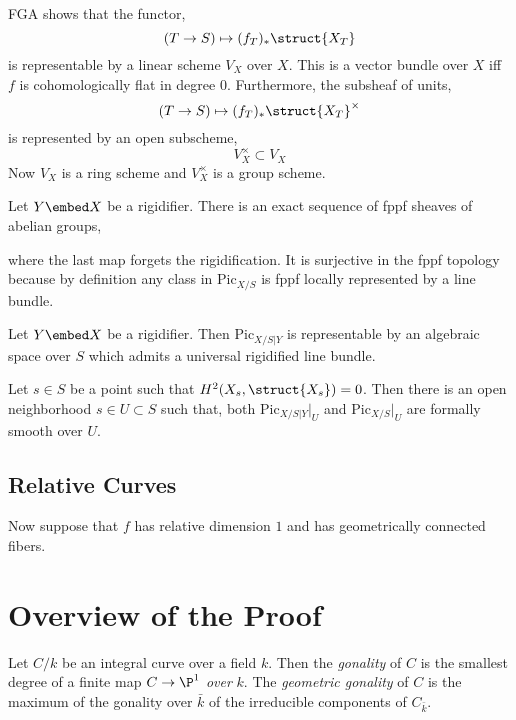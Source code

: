 \documentclass[12pt]{article}
\newcommand{\fPic}{\mathrm{Pic}}
\begin{document}
FGA shows that the functor,
\[ (T \to S) \mapsto (f_T)_* \struct{X_T} \]
is representable by a linear scheme $V_X$ over $X$. This is a vector bundle over $X$ iff $f$ is cohomologically flat in degree $0$. Furthermore, the subsheaf of units,
\[ (T \to S) \mapsto (f_T)_* \struct{X_T}^\times \]
is represented by an open subscheme,
\[ V_X^\times \subset V_X \]
Now $V_X$ is a ring scheme and $V_X^\times$ is a group scheme. 

\begin{prop}
Let $Y \embed X$ be a rigidifier. 
There is an exact sequence of fppf sheaves of abelian groups,
\begin{center}
\end{center}
where the last map forgets the rigidification. It is surjective in the fppf topology because by definition any class in $\fPic_{X/S}$ is fppf locally represented by a line bundle.
\end{prop}

\begin{theorem}[8.3.3]
Let $Y \embed X$ be a rigidifier. Then $\fPic_{X/S|Y}$ is representable by an algebraic space over $S$ which admits a universal rigidified line bundle.
\end{theorem}

\begin{prop}
Let $s \in S$ be a point such that $H^2(X_s, \struct{X_s}) = 0$. Then there is an open neighborhood $s \in U \subset S$ such that, both $\fPic_{X/S|Y}|_U$ and $\fPic_{X/S}|_U$ are formally smooth over $U$.
\end{prop}

\subsection{Relative Curves}

Now suppose that $f$ has relative dimension $1$ and has geometrically connected fibers.


\section{Overview of the Proof}

\newcommand{\gon}{\mathrm{gon}}

\begin{defn}
Let $C/k$ be an integral curve over a field $k$. Then the \textit{gonality} of $C$ is the smallest degree of a finite map $C \to \P^1$ \textit{over} $k$. The \textit{geometric gonality} of $C$ is the maximum of the gonality over $\bar{k}$ of the irreducible components of $C_{\bar{k}}$. 
\end{defn}
\end{document}
